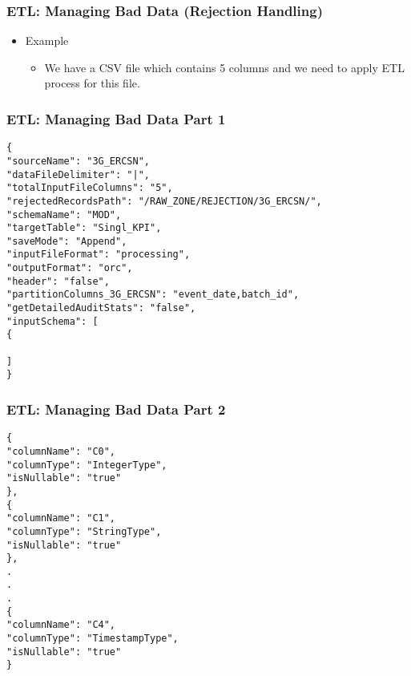 \begin{frame}[fragile]
	\frametitle{ETL: Managing Bad Data (Rejection Handling)}

	\begin{itemize}[<+->]
		\item Example
		\begin{itemize}[<+->]
			\item  We have a CSV file which contains 5 columns and we need to apply ETL process for this file.			
		\end{itemize}
	\end{itemize}



\end{frame}
\begin{frame}[fragile]
	\frametitle{ETL: Managing Bad Data Part 1}

	\begin{lstlisting}[style=json]
{
"sourceName": "3G_ERCSN",
"dataFileDelimiter": "|",
"totalInputFileColumns": "5",
"rejectedRecordsPath": "/RAW_ZONE/REJECTION/3G_ERCSN/",
"schemaName": "MOD",
"targetTable": "Singl_KPI",
"saveMode": "Append",
"inputFileFormat": "processing",
"outputFormat": "orc",
"header": "false",
"partitionColumns_3G_ERCSN": "event_date,batch_id",
"getDetailedAuditStats": "false",
"inputSchema": [
{

]
}
	\end{lstlisting}
	
\end{frame}
\begin{frame}[fragile]
	\frametitle{ETL: Managing Bad Data Part 2}
	
\begin{lstlisting}[style=json,basicstyle=\scriptsize ]
{
"columnName": "C0",
"columnType": "IntegerType",
"isNullable": "true"
},
{
"columnName": "C1",
"columnType": "StringType",
"isNullable": "true"
},
.
.
.
{
"columnName": "C4",
"columnType": "TimestampType",
"isNullable": "true"
}
\end{lstlisting}
	
\end{frame}

